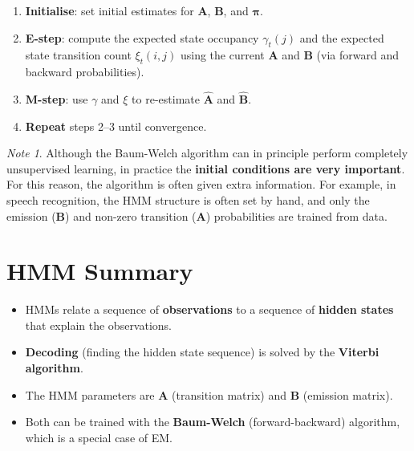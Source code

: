 \documentclass[11pt,a4paper]{article}
\theoremstyle{definition}
\theoremstyle{plain}
\theoremstyle{remark}
\newtheorem*{remark}{Note}
\begin{document}
\begin{tcolorbox}[colback=cyan!5!white,colframe=cyan!75!black,title=\textbf{Baum-Welch Algorithm}]
\begin{enumerate}
    \item \textbf{Initialise}: set initial estimates for $\mathbf{A}$, $\mathbf{B}$, and $\boldsymbol{\pi}$.
    \item \textbf{E-step}: compute the expected state occupancy $\gamma_t(j)$ and the expected state transition count $\xi_t(i,j)$ using the current $\mathbf{A}$ and $\mathbf{B}$ (via forward and backward probabilities).
    \item \textbf{M-step}: use $\gamma$ and $\xi$ to re-estimate $\hat{\mathbf{A}}$ and $\hat{\mathbf{B}}$.
    \item \textbf{Repeat} steps 2--3 until convergence.
\end{enumerate}
\end{tcolorbox}

\begin{remark}
Although the Baum-Welch algorithm can in principle perform completely unsupervised learning, in practice the \textbf{initial conditions are very important}. For this reason, the algorithm is often given extra information. For example, in speech recognition, the HMM structure is often set by hand, and only the emission ($\mathbf{B}$) and non-zero transition ($\mathbf{A}$) probabilities are trained from data.
\end{remark}

\section{HMM Summary}

\begin{tcolorbox}[colback=blue!5!white,colframe=blue!75!black,title=\textbf{HMM Summary}]
\begin{itemize}
    \item HMMs relate a sequence of \textbf{observations} to a sequence of \textbf{hidden states} that explain the observations.
    \item \textbf{Decoding} (finding the hidden state sequence) is solved by the \textbf{Viterbi algorithm}.
    \item The HMM parameters are $\mathbf{A}$ (transition matrix) and $\mathbf{B}$ (emission matrix).
    \item Both can be trained with the \textbf{Baum-Welch} (forward-backward) algorithm, which is a special case of EM.
\end{itemize}
\end{tcolorbox}
\end{document}

